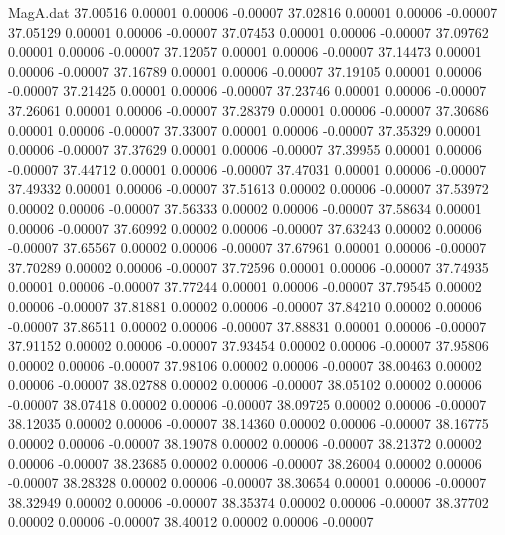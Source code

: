 \begin{filecontents}{MagA.dat}
  37.00516    0.00001    0.00006   -0.00007
  37.02816    0.00001    0.00006   -0.00007
  37.05129    0.00001    0.00006   -0.00007
  37.07453    0.00001    0.00006   -0.00007
  37.09762    0.00001    0.00006   -0.00007
  37.12057    0.00001    0.00006   -0.00007
  37.14473    0.00001    0.00006   -0.00007
  37.16789    0.00001    0.00006   -0.00007
  37.19105    0.00001    0.00006   -0.00007
  37.21425    0.00001    0.00006   -0.00007
  37.23746    0.00001    0.00006   -0.00007
  37.26061    0.00001    0.00006   -0.00007
  37.28379    0.00001    0.00006   -0.00007
  37.30686    0.00001    0.00006   -0.00007
  37.33007    0.00001    0.00006   -0.00007
  37.35329    0.00001    0.00006   -0.00007
  37.37629    0.00001    0.00006   -0.00007
  37.39955    0.00001    0.00006   -0.00007
  37.44712    0.00001    0.00006   -0.00007
  37.47031    0.00001    0.00006   -0.00007
  37.49332    0.00001    0.00006   -0.00007
  37.51613    0.00002    0.00006   -0.00007
  37.53972    0.00002    0.00006   -0.00007
  37.56333    0.00002    0.00006   -0.00007
  37.58634    0.00001    0.00006   -0.00007
  37.60992    0.00002    0.00006   -0.00007
  37.63243    0.00002    0.00006   -0.00007
  37.65567    0.00002    0.00006   -0.00007
  37.67961    0.00001    0.00006   -0.00007
  37.70289    0.00002    0.00006   -0.00007
  37.72596    0.00001    0.00006   -0.00007
  37.74935    0.00001    0.00006   -0.00007
  37.77244    0.00001    0.00006   -0.00007
  37.79545    0.00002    0.00006   -0.00007
  37.81881    0.00002    0.00006   -0.00007
  37.84210    0.00002    0.00006   -0.00007
  37.86511    0.00002    0.00006   -0.00007
  37.88831    0.00001    0.00006   -0.00007
  37.91152    0.00002    0.00006   -0.00007
  37.93454    0.00002    0.00006   -0.00007
  37.95806    0.00002    0.00006   -0.00007
  37.98106    0.00002    0.00006   -0.00007
  38.00463    0.00002    0.00006   -0.00007
  38.02788    0.00002    0.00006   -0.00007
  38.05102    0.00002    0.00006   -0.00007
  38.07418    0.00002    0.00006   -0.00007
  38.09725    0.00002    0.00006   -0.00007
  38.12035    0.00002    0.00006   -0.00007
  38.14360    0.00002    0.00006   -0.00007
  38.16775    0.00002    0.00006   -0.00007
  38.19078    0.00002    0.00006   -0.00007
  38.21372    0.00002    0.00006   -0.00007
  38.23685    0.00002    0.00006   -0.00007
  38.26004    0.00002    0.00006   -0.00007
  38.28328    0.00002    0.00006   -0.00007
  38.30654    0.00001    0.00006   -0.00007
  38.32949    0.00002    0.00006   -0.00007
  38.35374    0.00002    0.00006   -0.00007
  38.37702    0.00002    0.00006   -0.00007
  38.40012    0.00002    0.00006   -0.00007

\end{filecontents}
